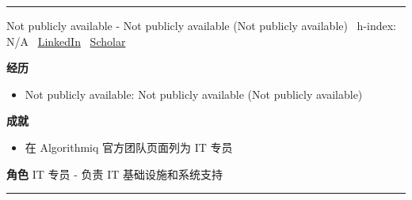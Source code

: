 \vspace{2pt}\hrule\vspace{2pt}
\vspace{4pt}
\par{\footnotesize\color{graytext}Not publicly available - Not publicly available (Not publicly available) \textbar\  h-index: N/A \textbar\  \href{https://www.linkedin.com/in/jason-gumarang/}{LinkedIn} \textbar\  \href{N/A}{Scholar}}
\par{\footnotesize\color{mainred}\textbf{经历}}
\begin{itemize}[leftmargin=1.2em,itemsep=0pt,topsep=0pt]
\item {\footnotesize Not publicly available: Not publicly available (Not publicly available)}
\end{itemize}
\par{\footnotesize\color{mainred}\textbf{成就}}
\begin{itemize}[leftmargin=1.2em,itemsep=0pt,topsep=0pt]
\item {\footnotesize 在 Algorithmiq 官方团队页面列为 IT 专员}
\end{itemize}
\par{\footnotesize\color{mainred}\textbf{角色}} {\footnotesize IT 专员 - 负责 IT 基础设施和系统支持}
\vspace{2pt}\hrule\vspace{2pt}
